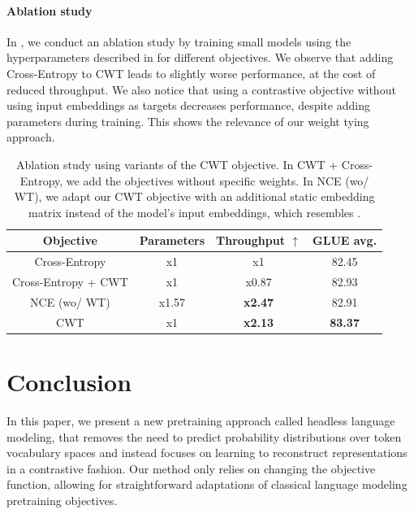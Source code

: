 \paragraph{Ablation study}

In , we conduct an ablation study by training small models using the hyperparameters described in  for different objectives. We observe that adding Cross-Entropy to CWT leads to slightly worse performance, at the cost of reduced throughput. We also notice that using a contrastive objective without using input embeddings as targets decreases performance, despite adding parameters during training. This shows the relevance of our weight tying approach.

\begin{table}[h]
\centering \scriptsize
\begin{tabular}{@{}cccc@{}}
\toprule
Objective           & Parameters & Throughput $\uparrow$     & GLUE avg.      \\ \midrule
Cross-Entropy       & x1        & x1             & 82.45          \\
Cross-Entropy + CWT & x1        & x0.87          & 82.93          \\
NCE (wo/ WT)        & x1.57        & \textbf{x2.47} & 82.91          \\
CWT                 & x1        & \textbf{x2.13} & \textbf{83.37} \\ \bottomrule
\end{tabular}
\caption{Ablation study using variants of the CWT objective. In CWT + Cross-Entropy, we add the objectives without specific weights. In NCE (wo/ WT), we adapt our CWT objective with an additional static embedding matrix instead of the model's input embeddings, which resembles \citet{ma-collins-2018-noise}.}
\label{tab:ablation}
\end{table}



\section*{Conclusion}
In this paper, we present a new pretraining approach called headless language modeling, that removes the need to predict probability distributions over token vocabulary spaces and instead focuses on learning to reconstruct representations in a contrastive fashion. Our method only relies on changing the objective function, allowing for straightforward adaptations of classical language modeling pretraining objectives.

